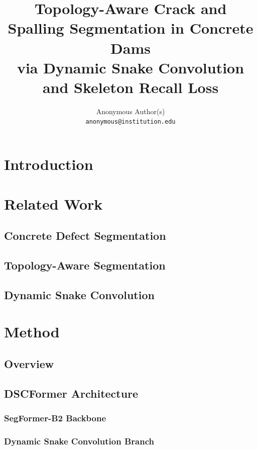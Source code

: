 \documentclass[10pt,twocolumn,letterpaper]{article}
\begin{document}
\title{Topology-Aware Crack and Spalling Segmentation in Concrete Dams\\via Dynamic Snake Convolution and Skeleton Recall Loss}

\author{
Anonymous Author(s)\\
{\tt\small anonymous@institution.edu}
}

\maketitle

\begin{abstract}
\end{abstract}

\section{Introduction}

\section{Related Work}
\subsection{Concrete Defect Segmentation}
\subsection{Topology-Aware Segmentation}
\subsection{Dynamic Snake Convolution}

\section{Method}
\subsection{Overview}
\subsection{DSCFormer Architecture}
\subsubsection{SegFormer-B2 Backbone}
\subsubsection{Dynamic Snake Convolution Branch}
\end{document}
